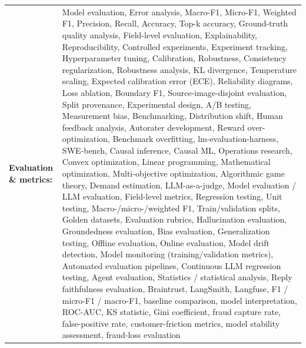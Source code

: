 \documentclass[letterpaper,11pt]{article}
\begin{document}
\begin{tabularx}{\linewidth}{@{}>{\raggedright\arraybackslash}p{1.8in}X@{}}
\textbf{Evaluation \& metrics:} & \footnotesize{Model evaluation, Error analysis, Macro-F1, Micro-F1, Weighted F1, Precision, Recall, Accuracy, Top-k accuracy, Ground-truth quality analysis, Field-level evaluation, Explainability, Reproducibility, Controlled experiments, Experiment tracking, Hyperparameter tuning, Calibration, Robustness, Consistency regularization, Robustness analysis, KL divergence, Temperature scaling, Expected calibration error (ECE), Reliability diagrams, Loss ablation, Boundary F1, Source-image-disjoint evaluation, Split provenance, Experimental design, A/B testing, Measurement bias, Benchmarking, Distribution shift, Human feedback analysis, Autorater development, Reward over-optimization, Benchmark overfitting, lm-evaluation-harness, SWE-bench, Causal inference, Causal ML, Operations research, Convex optimization, Linear programming, Mathematical optimization, Multi-objective optimization, Algorithmic game theory, Demand estimation, LLM-as-a-judge, Model evaluation / LLM evaluation, Field-level metrics, Regression testing, Unit testing, Macro-/micro-/weighted F1, Train/validation splits, Golden datasets, Evaluation rubrics, Hallucination evaluation, Groundedness evaluation, Bias evaluation, Generalization testing, Offline evaluation, Online evaluation, Model drift detection, Model monitoring (training/validation metrics), Automated evaluation pipelines, Continuous LLM regression testing, Agent evaluation, Statistics / statistical analysis, Reply faithfulness evaluation, Braintrust, LangSmith, Langfuse, F1 / micro-F1 / macro-F1, baseline comparison, model interpretation, ROC-AUC, KS statistic, Gini coefficient, fraud capture rate, false-positive rate, customer-friction metrics, model stability assessment, fraud-loss evaluation}\\
\end{tabularx}
\par\vspace{2pt}
\end{document}
